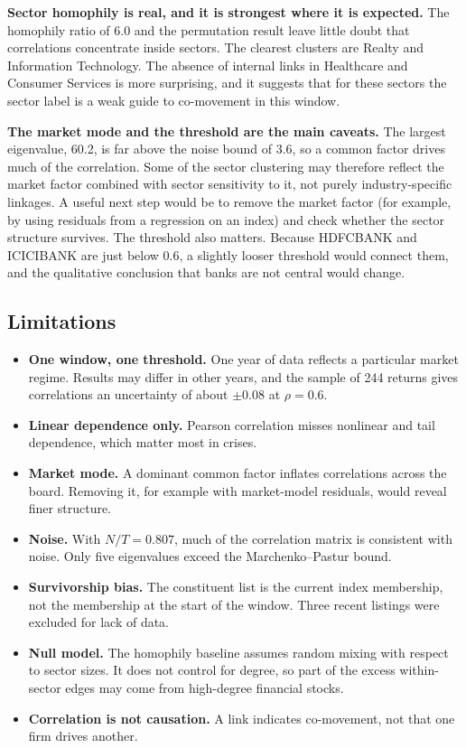 \documentclass[12pt,a4paper]{report}
\begin{document}
\textbf{Sector homophily is real, and it is strongest where it is expected.} The homophily ratio of 6.0 and the permutation result leave little doubt that correlations concentrate inside sectors. The clearest clusters are Realty and Information Technology. The absence of internal links in Healthcare and Consumer Services is more surprising, and it suggests that for these sectors the sector label is a weak guide to co-movement in this window.

\textbf{The market mode and the threshold are the main caveats.} The largest eigenvalue, 60.2, is far above the noise bound of 3.6, so a common factor drives much of the correlation. Some of the sector clustering may therefore reflect the market factor combined with sector sensitivity to it, not purely industry-specific linkages. A useful next step would be to remove the market factor (for example, by using residuals from a regression on an index) and check whether the sector structure survives. The threshold also matters. Because HDFCBANK and ICICIBANK are just below $0.6$, a slightly looser threshold would connect them, and the qualitative conclusion that banks are not central would change.

\subsection*{Limitations}
\begin{itemize}
  \item \textbf{One window, one threshold.} One year of data reflects a particular market regime. Results may differ in other years, and the sample of 244 returns gives correlations an uncertainty of about $\pm0.08$ at $\rho=0.6$.
  \item \textbf{Linear dependence only.} Pearson correlation misses nonlinear and tail dependence, which matter most in crises.
  \item \textbf{Market mode.} A dominant common factor inflates correlations across the board. Removing it, for example with market-model residuals, would reveal finer structure.
  \item \textbf{Noise.} With $N/T=0.807$, much of the correlation matrix is consistent with noise. Only five eigenvalues exceed the Marchenko--Pastur bound.
  \item \textbf{Survivorship bias.} The constituent list is the current index membership, not the membership at the start of the window. Three recent listings were excluded for lack of data.
  \item \textbf{Null model.} The homophily baseline assumes random mixing with respect to sector sizes. It does not control for degree, so part of the excess within-sector edges may come from high-degree financial stocks.
  \item \textbf{Correlation is not causation.} A link indicates co-movement, not that one firm drives another.
\end{itemize}
\end{document}
